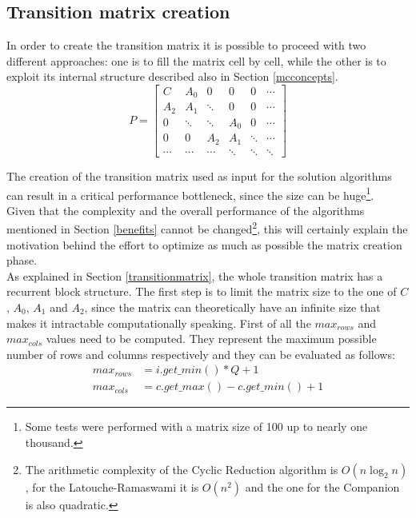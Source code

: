 \subsection{Transition matrix creation} \label{matrixcreation}
In order to create the transition matrix it is possible to proceed with two different approaches: one is to fill the matrix cell by cell, while the other is to exploit its internal structure described also in Section \ref{mcconcepts}.
\begin{equation*}
  P = 
  \begin{bmatrix}
    C & A_{0} & 0 & 0 & 0 & \cdots \\
    A_{2} & A_{1} & \ddots & 0 & 0 & \cdots \\
    0 & \ddots & \ddots & A_{0} & 0 & \cdots \\
    0 & 0 & A_{2} & A_{1} & \ddots & \cdots \\
    \cdots & \cdots & \cdots & \ddots & \ddots & \ddots
  \end{bmatrix}
\end{equation*}

The creation of the transition matrix used as input for the solution algorithms can result in a critical performance bottleneck, since the size can be huge\footnote{Some tests were performed with a matrix size of 100 up to nearly one thousand.}.\\ 
Given that the complexity and the overall performance of the algorithms mentioned in Section \ref{benefits} cannot be changed\footnote{The arithmetic complexity of the Cyclic Reduction algorithm is \( O(n\log_2n) \), for the Latouche-Ramaswami it is \( O(n^{2}) \) and the one for the Companion is also quadratic.}, this will certainly explain the motivation behind the effort to optimize as much as possible the matrix creation phase.\\
As explained in Section \ref{transitionmatrix}, the whole transition matrix has a recurrent block structure. The first step is to limit the matrix size to the one of \( C \), \( A_{0} \), \( A_{1} \) and \( A_{2} \), since the matrix can theoretically have an infinite size that makes it intractable computationally speaking. First of all the \( max_{rows} \) and \( max_{cols} \) values need to be computed. They represent the maximum possible number of rows and columns respectively and they can be evaluated as follows: 
\begin{equation*}
\begin{split}
  max_{rows} &= i.get\_min() * Q + 1 \\
  max_{cols} &= c.get\_max() - c.get\_min() + 1
\end{split}
\end{equation*}

